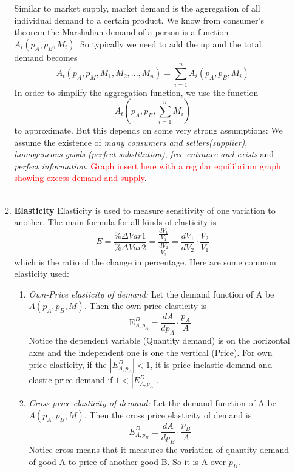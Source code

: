 \documentclass[10pt]{article}
\newenvironment{changemargin}[2]{%
  \begin{list}{}{%
    \setlength{\topsep}{0pt}%
    \setlength{\leftmargin}{#1}%
    \setlength{\rightmargin}{#2}%
    \setlength{\listparindent}{\parindent}%
    \setlength{\itemindent}{\parindent}%
    \setlength{\parsep}{\parskip}%
  }%
  \item[]}{\end{list}}
\begin{document}
\begin{changemargin}{-0.125in}{0in}
\begin{enumerate}
\begin{enumerate}
        Similar to market supply, market demand is the aggregation of all individual demand to a certain product. We know from consumer's theorem the Marshalian demand of a person is a function $A_i(p_A,p_B,M_i)$. So typically we need to add the up and the total demand becomes
        \[
        A_t(p_A,p_M, M_1,M_2,...,M_n) = \sum^n_{i=1}A_i(p_A,p_B,M_i)
        \]
        In order to simplify the aggregation function, we use the function 
        \[
        A_t(p_A,p_B,\sum^n_{i=1} M_i)
        \]
        to approximate. But this depends on some very strong assumptions: We assume the existence of \textit{many consumers and sellers(supplier)}, \textit{homogeneous goods (perfect substitution)}, \textit{free entrance and exists} and \textit{perfect information}. \textcolor{red}{Graph insert here with a regular equilibrium graph showing excess demand and supply}.
        \\
        \\
        \item \textbf{Elasticity}
             Elasticity is used to measure sensitivity of one variation to another. The main formula for all kinds of elasticity is 
        \[
        E = \frac{\%\Delta Var1}{\%\Delta Var2} = \frac{\frac{dV_1}{V_1}}{\frac{dV_2}{V_2}} = \frac{dV_1}{dV_2}\cdot\frac{V_2}{V_1}
        \]
        which is the ratio of the change in percentage. Here are some common elasticity used: 
        \begin{enumerate}
            \item \textit{Own-Price elasticity of demand:}
            Let the demand function of A be $A(p_A,p_B,M)$. Then the own price elasticity is 
            \[
            \mathrm{E}^D_{A,p_A} = \frac{dA}{dp_A}\cdot \frac{p_A}{A}
            \]
            Notice the dependent variable (Quantity demand) is on the horizontal axes and the independent one is one the vertical (Price). For own price elasticity, if the $|E^D_{A,p_A}| <1$, it is price inelastic demand and elastic price demand if $1 < |E^D_{A,p_A}|$.
            \\
            \item \textit{Cross-price elasticity of demand:}
            Let the demand function of A be $A(p_A,p_B,M)$. Then the cross price elasticity of demand is 
            \[
            E^D_{A,p_B} = \frac{dA}{dp_B} \cdot \frac{p_B}{A}
            \]
            Notice cross means that it measures the variation of quantity demand of good A to price of another good B. So it is A over $p_B$.
        \end{enumerate}

\end{enumerate}
\end{enumerate}
\end{changemargin}
\end{document}
